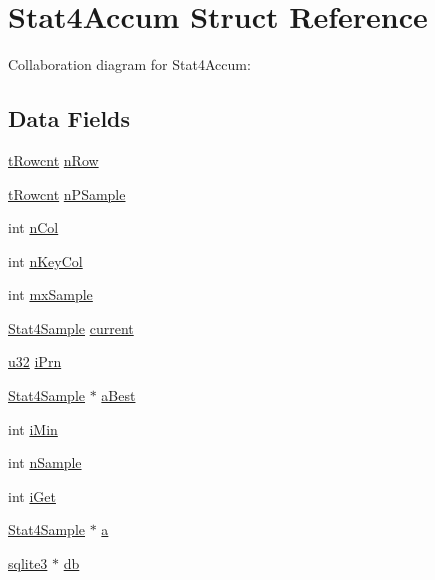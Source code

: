 \hypertarget{struct_stat4_accum}{}\section{Stat4\+Accum Struct Reference}
\label{struct_stat4_accum}


Collaboration diagram for Stat4\+Accum\+:
\subsection*{Data Fields}
\begin{DoxyCompactItemize}
\item 
\hyperlink{sqlite3_8c_a6de101211e945e499510b624a65c28a4}{t\+Rowcnt} \hyperlink{struct_stat4_accum_afd947c3e11387b7b825715b423b4d468}{n\+Row}
\item 
\hyperlink{sqlite3_8c_a6de101211e945e499510b624a65c28a4}{t\+Rowcnt} \hyperlink{struct_stat4_accum_af19753f3dc06f6bd4b3a0825cc90bf8d}{n\+P\+Sample}
\item 
int \hyperlink{struct_stat4_accum_a354f4c2d87e40ee3eab3758d0716280e}{n\+Col}
\item 
int \hyperlink{struct_stat4_accum_a04c2defb001c774592ca32aad5921050}{n\+Key\+Col}
\item 
int \hyperlink{struct_stat4_accum_a5a834cdb422be99fc2ac6bc8c0425ea2}{mx\+Sample}
\item 
\hyperlink{struct_stat4_sample}{Stat4\+Sample} \hyperlink{struct_stat4_accum_ac33cf9e2b2b87900f328d9b16a098582}{current}
\item 
\hyperlink{sqlite3_8c_a03ad5adfaeb9b7640dde78a0cc390319}{u32} \hyperlink{struct_stat4_accum_a19a0050772abcffd5bab5910dac2deee}{i\+Prn}
\item 
\hyperlink{struct_stat4_sample}{Stat4\+Sample} $\ast$ \hyperlink{struct_stat4_accum_a297517497264a2509f5d49c2b2b2d6a3}{a\+Best}
\item 
int \hyperlink{struct_stat4_accum_abda8ced2962aa75eff51e5b07cfca50b}{i\+Min}
\item 
int \hyperlink{struct_stat4_accum_ab53ecee268e3f1fea30aaf4587763fd9}{n\+Sample}
\item 
int \hyperlink{struct_stat4_accum_a75256a54ea63fee17419a860d7e1712f}{i\+Get}
\item 
\hyperlink{struct_stat4_sample}{Stat4\+Sample} $\ast$ \hyperlink{struct_stat4_accum_a31771a569b30ca80c82809abb99294f9}{a}
\item 
\hyperlink{structsqlite3}{sqlite3} $\ast$ \hyperlink{struct_stat4_accum_ad6e663497d2c934364b3bcf07496b30b}{db}
\end{DoxyCompactItemize}


